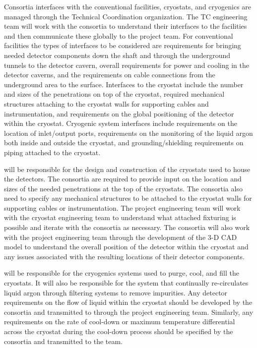 Consortia interfaces with the conventional facilities, cryostats, and
cryogenics are managed through the  Technical Coordination
organization.  The TC engineering team will work with the
consortia to understand their interfaces to the facilities and then
communicate these globally to the  project team.  For conventional
facilities the types of interfaces to be considered are requirements
for bringing needed detector components down the shaft and through the
underground tunnels to the detector cavern, overall requirements for
power and cooling in the detector caverns, and the requirements on
cable connections from the underground area to the surface.
Interfaces to the cryostat include the number and sizes of the
penetrations on top of the cryostat, required mechanical structures
attaching to the cryostat walls for supporting cables and
instrumentation, and requirements on the global positioning of the
detector within the cryostat.  Cryogenic system interfaces include
requirements on the location of inlet/output ports, requirements on
the monitoring of the liquid argon both inside and outside the
cryostat, and grounding/shielding requirements on piping attached to
the cryostat.

 will be responsible for the design and construction of the
cryostats used to house the detectors.  The consortia are required to
provide input on the location and sizes of the needed penetrations at
the top of the cryostats.  The consortia also need to specify any
mechanical structures to be attached to the cryostat walls for
supporting cables or instrumentation.  The  project engineering
team will work with the  cryostat engineering team to understand
what attached fixturing is possible and iterate with the consortia as
necessary.  The consortia will also work with the project engineering
team through the development of the 3-D CAD model to understand the
overall position of the detector within the cryostat and any issues
associated with the resulting locations of their detector components.

 will be responsible for the cryogenics systems used to purge,
cool, and fill the cryostats.  It will also be responsible for the
system that continually re-circulates liquid argon through filtering
systems to remove impurities.  Any detector requirements on the flow
of liquid within the cryostat should be developed by the consortia and
transmitted to  through the project engineering team.  Similarly,
any requirements on the rate of cool-down or maximum temperature
differential across the cryostat during the cool-down process should
be specified by the consortia and transmitted to the  team.

